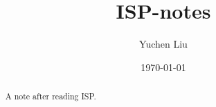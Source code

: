 \documentclass{article}
\title{ISP-notes}
\author{Yuchen Liu}
\date{\today}
\begin{document}
\maketitle
\tableofcontents
\begin{abstract}
    A note after reading ISP.
\end{abstract}
\end{document}
